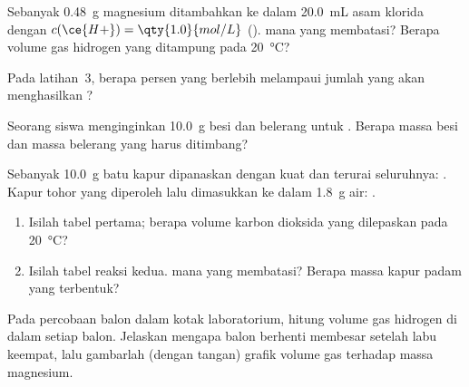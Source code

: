 \begin{exercise}[$\star\star$]\label{exo:g10:reaction-progress-table:10}
Sebanyak \qty{0.48}{g} magnesium ditambahkan ke dalam \qty{20.0}{mL} asam
klorida dengan $c(\ce{H+}) = \qty{1.0}{mol/L}$
().  mana yang membatasi? Berapa
volume gas hidrogen yang ditampung pada \qty{20}{\celsius}?
\end{exercise}

\begin{exercise}[$\star\star$]\label{exo:g10:reaction-progress-table:11}
Pada latihan~3, berapa persen  yang berlebih melampaui jumlah
yang akan menghasilkan ?
\end{exercise}

\begin{exercise}[$\star\star\star$]\label{exo:g10:reaction-progress-table:12}
Seorang siswa menginginkan \qty{10.0}{g}  besi dan
belerang untuk . Berapa massa besi dan massa belerang
yang harus ditimbang?
\end{exercise}

\begin{exercise}[$\star\star\star$]\label{exo:g10:reaction-progress-table:13}
Sebanyak \qty{10.0}{g} batu kapur  dipanaskan dengan kuat dan
terurai seluruhnya: . Kapur tohor  yang
diperoleh lalu dimasukkan ke dalam \qty{1.8}{g} air:
.
\begin{enumerate}
  \item Isilah tabel  pertama; berapa volume karbon
        dioksida yang dilepaskan pada \qty{20}{\celsius}?
  \item Isilah tabel reaksi kedua.  mana yang membatasi? Berapa
        massa kapur padam  yang terbentuk?
\end{enumerate}
\end{exercise}

\begin{exercise}[$\star\star\star$]\label{exo:g10:reaction-progress-table:14}
Pada percobaan balon dalam kotak laboratorium, hitung volume gas
hidrogen di dalam setiap balon. Jelaskan mengapa balon berhenti membesar
setelah labu keempat, lalu gambarlah (dengan tangan) grafik volume gas
terhadap massa magnesium.
\end{exercise}

